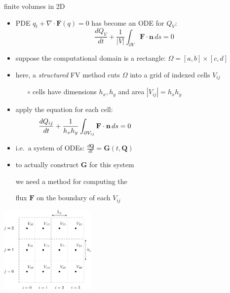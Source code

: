 \documentclass[10pt,hyperref,dvipsnames]{beamer}
\newcommand{\bn}{\mathbf{n}}
\newcommand{\bF}{\mathbf{F}}
\newcommand{\bG}{\mathbf{G}}
\newcommand{\bQ}{\mathbf{Q}}
\newcommand{\Div}{\nabla\cdot}
\newcommand{\ds}{\displaystyle}
\begin{document}
\begin{frame}{finite volumes in 2D}

\begin{itemize}
\item PDE $q_t + \Div \bF(q) = 0$ has become an ODE for $Q_V$:
    $$\frac{dQ_V}{dt} + \frac{1}{|V|} \int_{\partial V} \bF\cdot \bn\,ds = 0$$
\item suppose the computational domain is a rectangle: $\Omega = [a,b] \times [c,d]$
\item here, a \emph{structured} FV method cuts $\Omega$ into a grid of indexed cells $V_{ij}$
    \begin{itemize}
    \item[$\circ$] cells have dimensions $h_x,h_y$ and area $|V_{ij}| = h_x h_y$
    \end{itemize}
\item apply the equation for each cell:
    $$\frac{dQ_{ij}}{dt} + \frac{1}{h_x h_y} \int_{\partial V_{ij}} \bF\cdot \bn\,ds = 0 \hspace{50mm}$$
\item i.e.~a system of ODEs: $\ds \frac{d\bQ}{dt} = \bG(t,\bQ)$
\item to actually construct $\bG$ for this system

we need a method for computing the

flux $\bF$ on the boundary of each $V_{ij}$
\end{itemize}

\vspace{-40mm}
\hfill \includegraphics[width=0.35\textwidth]{figs/bueler11p1}
\end{frame}
\end{document}
